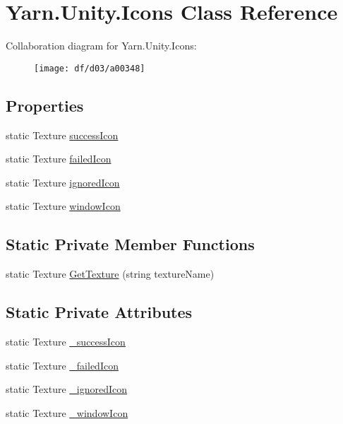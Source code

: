 \hypertarget{a00042}{\section{Yarn.\-Unity.\-Icons Class Reference}
\label{a00042}
}


Collaboration diagram for Yarn.\-Unity.\-Icons\-:
\nopagebreak
\begin{figure}[H]
\begin{center}
\leavevmode
\texttt{[image: df/d03/a00348]}
\end{center}
\end{figure}
\subsection*{Properties}
\begin{DoxyCompactItemize}
\item 
static Texture \hyperlink{a00042_aec8aea03eb6e31771ebc98e0611fff79}{success\-Icon}
\item 
static Texture \hyperlink{a00042_aae7cc0e5016db04a90b2aa0e80957626}{failed\-Icon}
\item 
static Texture \hyperlink{a00042_a3f03f2f0fa137e349853d755e79f2e4a}{ignored\-Icon}
\item 
static Texture \hyperlink{a00042_aa78ab016ad041bc36850c8b20ba63972}{window\-Icon}
\end{DoxyCompactItemize}
\subsection*{Static Private Member Functions}
\begin{DoxyCompactItemize}
\item 
static Texture \hyperlink{a00042_a267896b2c4512f5b17772e7e1e46d6da}{Get\-Texture} (string texture\-Name)
\end{DoxyCompactItemize}
\subsection*{Static Private Attributes}
\begin{DoxyCompactItemize}
\item 
static Texture \hyperlink{a00042_a40e137f48495168d4423c103c8935a1b}{\-\_\-success\-Icon}
\item 
static Texture \hyperlink{a00042_a75ef0bcf3f5968f11949e6bfa4fdddd5}{\-\_\-failed\-Icon}
\item 
static Texture \hyperlink{a00042_aeb6761c6115d55f24df4ad963a2d224c}{\-\_\-ignored\-Icon}
\item 
static Texture \hyperlink{a00042_abba8fef6cc12836ea431a8a7c9e2f3db}{\-\_\-window\-Icon}
\end{DoxyCompactItemize}


